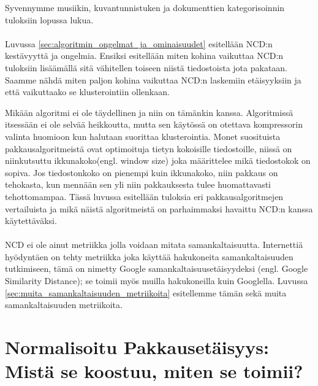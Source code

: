 \documentclass[11pt,finnish]{tktltiki2}
\theoremstyle{definition}
\theoremstyle{remark}
\begin{document}
  Syvennymme musiikin, kuvantunnistuken ja dokumenttien kategorisoinnin tuloksiin lopussa lukua.


\paragraph{} %
\label{par:intro-4}
  Luvussa \ref{sec:algoritmin_ongelmat_ja_ominaisuudet} esitellään NCD:n kestävyyttä ja ongelmia. Ensiksi esitellään miten kohina vaikuttaa NCD:n tuloksiin lisäämällä sitä vähitellen toiseen niistä tiedostoista jota pakataan. Saamme nähdä miten paljon kohina vaikuttaa NCD:n laskemiin etäisyyksiin ja että vaikuttaako se klusterointiin ollenkaan.

  Mikään algoritmi ei ole täydellinen ja niin on tämänkin kanssa. Algoritmissä itsessään ei ole selvää heikkoutta, mutta sen käytössä on otettava kompressorin valinta huomioon kun halutaan suorittaa klusterointia. Monet suosituista pakkausalgoritmeistä ovat optimoituja tietyn kokoisille tiedostoille, niissä on niinkutsuttu ikkunakoko(engl. window size) joka määrittelee mikä tiedostokok on sopiva. Jos tiedostonkoko on pienempi kuin ikkunakoko, niin pakkaus on tehokasta, kun mennään sen yli niin pakkauksesta tulee huomattavasti tehottomampaa. Tässä luvussa esitellään tuloksia eri pakkausalgoritmejen vertailuista ja mikä näistä algoritmeistä on parhaimmaksi havaittu NCD:n kanssa käytettäväksi.


\paragraph{} %
\label{par:intro-5}
  NCD ei ole ainut metriikka jolla voidaan mitata samankaltaisuutta. Internettiä hyödyntäen on tehty metriikka joka käyttää hakukoneita samankaltaisuuden tutkimiseen, tämä on nimetty Google samankaltaisuusetäisyydeksi (engl. Google Similarity Distance); se toimii myös muilla hakukoneilla kuin Googlella. Luvussa \ref{sec:muita_samankaltaisuuden_metriikoita} esitellemme tämän sekä muita samankaltaisuuden metriikoita.



\section{Normalisoitu Pakkausetäisyys: Mistä se koostuu, miten se toimii?} %
\label{sec:normalisoitu_pakkauset_isyys}
\end{document}
